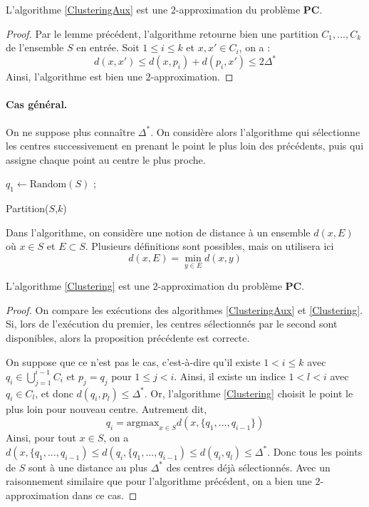 \begin{proposition}
L'algorithme \ref{ClusteringAux} est une $2$-approximation du problème $\mathbf{PC}$.
\end{proposition}

\begin{proof}
Par le lemme précédent, l'algorithme retourne bien une partition $C_1,...,C_k$ de l'ensemble $S$ en entrée. Soit $1\leq i \leq k$ et $x,x' \in C_i$, on a :
$$
d(x,x') \leq d(x,p_i) + d(p_i,x') \leq 2 \Delta^*
$$
Ainsi, l'algorithme est bien une $2$-approximation.
\end{proof}

\paragraph{Cas général.} On ne suppose plus connaître $\Delta^*$. On considère alors l'algorithme qui sélectionne les centres successivement en prenant le point le plus loin des précédents, puis qui assigne chaque point au centre le plus proche.

\begin{algorithm}
$q_1 \leftarrow \text{Random}(S)$ ;\\
\caption{Partition($S$,$k$)}\label{Clustering}
\end{algorithm} 

\begin{rem}
Dans l'algorithme, on considère une notion de distance à un ensemble $d(x,E)$ où $x\in S$ et $E\subset S$. Plusieurs définitions sont possibles, mais on utilisera ici 
$$
d(x,E) = \min_{y \in E} d(x,y)
$$
\end{rem}

\begin{proposition}
L'algorithme \ref{Clustering} est une $2$-approximation du problème $\mathbf{PC}$.
\end{proposition}

\begin{proof}
On compare les exécutions des algorithmes \ref{ClusteringAux} et \ref{Clustering}. Si, lors de l'exécution du premier, les centres sélectionnés par le second sont disponibles, alors la proposition précédente est correcte.

On suppose que ce n'est pas le cas, c'est-à-dire qu'il existe $1< i \leq k$ avec $q_i\in \bigcup_{j=1}^{i-1} C_i$ et $p_j=q_j$ pour $1\leq j <i$. Ainsi, il existe un indice $1<l<i$ avec $q_i \in C_l$, et donc $d(q_i,p_l) \leq \Delta^*$. Or, l'algorithme \ref{Clustering} choisit le point le plus loin pour nouveau centre. Autrement dit, 
$$
q_i = \text{argmax}_{x\in S} d(x, \{q_1,...,q_{i-1}\})
$$
Ainsi, pour tout $x\in S$, on a $d(x,\{q_1,...,q_{i-1}) \leq d(q_i,  \{q_1,...,q_{i-1}) \leq d(q_i,q_l) \leq \Delta^*$. Donc tous les points de $S$ sont à une distance au plus $\Delta^*$ des centres déjà sélectionnés. Avec un raisonnement similaire que pour l'algorithme précédent, on a bien une $2$-approximation dans ce cas. 
\end{proof}
